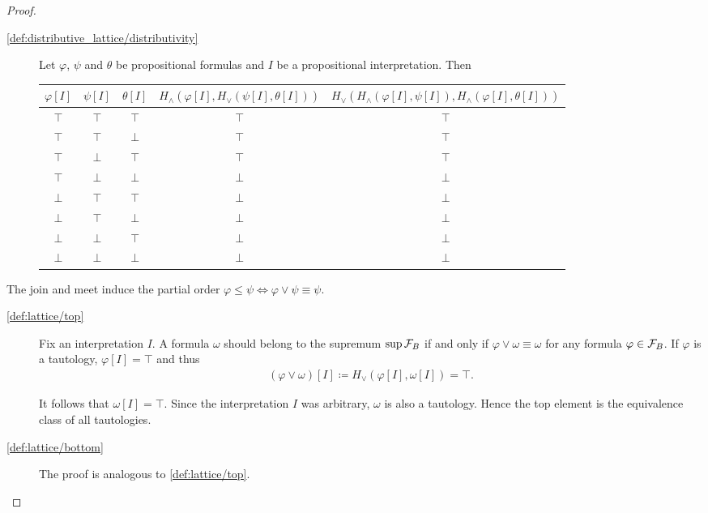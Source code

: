 \begin{proof}
\begin{description}
    \item[\ref{def:distributive_lattice/distributivity}] Let $\varphi$, $\psi$ and $\theta$ be propositional formulas and $I$ be a propositional interpretation. Then
    \begin{center}
      \begin{tabular}{c c c | c | c}
        $\varphi[I]$ & $\psi[I]$ & $\theta[I]$ & $H_\land(\varphi[I], H_\lor(\psi[I], \theta[I]))$ & $H_\lor(H_\land(\varphi[I], \psi[I]), H_\land(\varphi[I], \theta[I]))$ \\
        \hline
        $\top$       & $\top$    & $\top$      & $\top$                                            & $\top$ \\
        $\top$       & $\top$    & $\bot$      & $\top$                                            & $\top$ \\
        $\top$       & $\bot$    & $\top$      & $\top$                                            & $\top$ \\
        $\top$       & $\bot$    & $\bot$      & $\bot$                                            & $\bot$ \\
        $\bot$       & $\top$    & $\top$      & $\bot$                                            & $\bot$ \\
        $\bot$       & $\top$    & $\bot$      & $\bot$                                            & $\bot$ \\
        $\bot$       & $\bot$    & $\top$      & $\bot$                                            & $\bot$ \\
        $\bot$       & $\bot$    & $\bot$      & $\bot$                                            & $\bot$
      \end{tabular}
    \end{center}
  \end{description}

  The join and meet induce the partial order $\varphi \leq \psi \iff \varphi \lor \psi \equiv \psi$.

  \begin{description}
    \item[\ref{def:lattice/top}] Fix an interpretation $I$. A formula $\omega$ should belong to the supremum $\sup \mathcal F_B$ if and only if $\varphi \lor \omega \equiv \omega$ for any formula $\varphi \in \mathcal F_B$. If $\varphi$ is a tautology, $\varphi[I] = \top$ and thus
    \begin{align*}
      (\varphi \lor \omega)[I] \coloneqq H_\lor(\varphi[I], \omega[I]) = \top.
    \end{align*}

    It follows that $\omega[I] = \top$. Since the interpretation $I$ was arbitrary, $\omega$ is also a tautology. Hence the top element is the equivalence class of all tautologies.

    \item[\ref{def:lattice/bottom}] The proof is analogous to \ref{def:lattice/top}.
  \end{description}
\end{proof}
